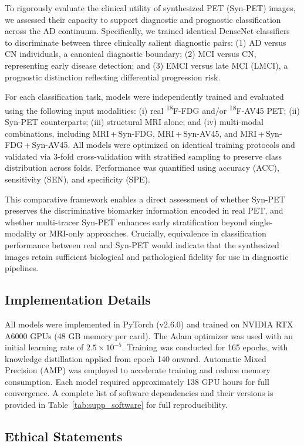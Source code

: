 \documentclass{article}
\begin{document}
To rigorously evaluate the clinical utility of synthesized PET (Syn-PET) images, we assessed their capacity to support diagnostic and prognostic classification across the AD continuum. Specifically, we trained identical DenseNet classifiers~\cite{huang2017densely} to discriminate between three clinically salient diagnostic pairs: (1)  AD versus CN individuals, a canonical diagnostic boundary; (2)  MCI versus CN, representing early disease detection; and (3) EMCI versus late MCI (LMCI), a prognostic distinction reflecting differential progression risk. 

For each classification task, models were independently trained and evaluated using the following input modalities: (i) real \textsuperscript{18}F-FDG and/or \textsuperscript{18}F-AV45 PET; (ii) Syn-PET counterparts; (iii) structural MRI alone; and (iv) multi-modal combinations, including MRI\,+\,Syn-FDG, MRI\,+\,Syn-AV45, and MRI\,+\,Syn-FDG\,+\,Syn-AV45. All models were optimized on identical training protocols and validated via 3-fold cross-validation with stratified sampling to preserve class distribution across folds. Performance was quantified using accuracy (ACC), sensitivity (SEN), and specificity (SPE).

This comparative framework enables a direct assessment of whether Syn-PET preserves the discriminative biomarker information encoded in real PET, and whether multi-tracer Syn-PET enhances early stratification beyond single-modality or MRI-only approaches. Crucially, equivalence in classification performance between real and Syn-PET would indicate that the synthesized images retain sufficient biological and pathological fidelity for use in diagnostic pipelines.
\subsection{Implementation Details}

All models were implemented in PyTorch (v2.6.0) and trained on NVIDIA RTX A6000 GPUs (48 GB memory per card). The Adam optimizer was used with an initial learning rate of $2.5 \times 10^{-5}$. Training was conducted for 165 epochs, with knowledge distillation applied from epoch 140 onward. Automatic Mixed Precision (AMP) was employed to accelerate training and reduce memory consumption. Each model required approximately 138 GPU hours for full convergence. A complete list of software dependencies and their versions is provided in Table~\ref{tab:supp_software} for full reproducibility.

\subsection{Ethical Statements}
\end{document}
